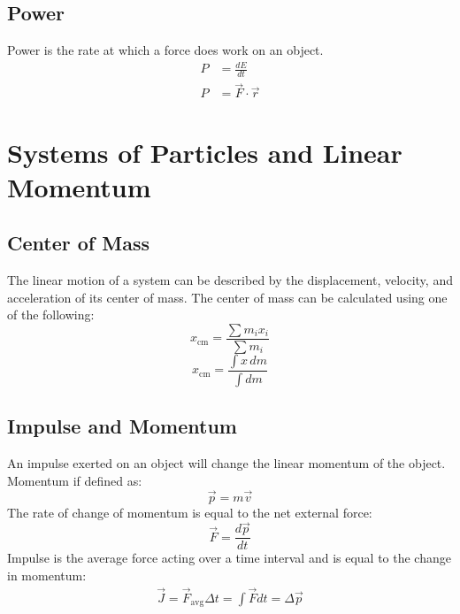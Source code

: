 \documentclass{article}
\begin{document}
        \subsection{Power}
            Power is the rate at which a force does work on an object.
            \begin{align}
                P &= \frac{dE}{dt} \\
                P &= \vec{F} \cdot \vec{r}
            \end{align}

    \section{Systems of Particles and Linear Momentum}

        \subsection{Center of Mass}
            The linear motion of a system can be described by the displacement, velocity, and acceleration of its center of mass. The center of mass can be calculated using one of the following:
            \begin{equation}
                x_\text{cm} = \frac{\sum m_i x_i}{\sum m_i}
            \end{equation}
            \begin{equation}
                x_\text{cm} = \frac{\int x \, dm}{\int dm}
            \end{equation}

        \subsection{Impulse and Momentum}
            An impulse exerted on an object will change the linear momentum of the object. Momentum if defined as:
            \begin{equation}
                \vec{p} = m \vec{v}
            \end{equation}
            The rate of change of momentum is equal to the net external force:
            \begin{equation}
                \vec{F} = \frac{d\vec{p}}{dt}
            \end{equation}
            Impulse is the average force acting over a time interval and is equal to the change in momentum:
            \begin{eqnarray}
                \vec{J} = \vec{F}_\text{avg} \Delta t = \int \vec{F} dt = \Delta \vec{p}
            \end{eqnarray}
\end{document}
